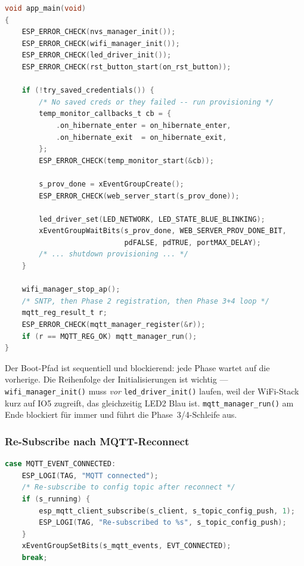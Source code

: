 \documentclass[a4paper,12pt]{article}
\begin{document}
\begin{lstlisting}[language=C, caption={Auszug aus
\texttt{gb-src/main/gb-src.c} --- Phasen-Orchestrierung.}]
void app_main(void)
{
    ESP_ERROR_CHECK(nvs_manager_init());
    ESP_ERROR_CHECK(wifi_manager_init());
    ESP_ERROR_CHECK(led_driver_init());
    ESP_ERROR_CHECK(rst_button_start(on_rst_button));

    if (!try_saved_credentials()) {
        /* No saved creds or they failed -- run provisioning */
        temp_monitor_callbacks_t cb = {
            .on_hibernate_enter = on_hibernate_enter,
            .on_hibernate_exit  = on_hibernate_exit,
        };
        ESP_ERROR_CHECK(temp_monitor_start(&cb));

        s_prov_done = xEventGroupCreate();
        ESP_ERROR_CHECK(web_server_start(s_prov_done));

        led_driver_set(LED_NETWORK, LED_STATE_BLUE_BLINKING);
        xEventGroupWaitBits(s_prov_done, WEB_SERVER_PROV_DONE_BIT,
                            pdFALSE, pdTRUE, portMAX_DELAY);
        /* ... shutdown provisioning ... */
    }

    wifi_manager_stop_ap();
    /* SNTP, then Phase 2 registration, then Phase 3+4 loop */
    mqtt_reg_result_t r;
    ESP_ERROR_CHECK(mqtt_manager_register(&r));
    if (r == MQTT_REG_OK) mqtt_manager_run();
}
\end{lstlisting}

Der Boot-Pfad ist sequentiell und blockierend: jede Phase wartet auf
die vorherige. Die Reihenfolge der Initialisierungen ist wichtig ---
\texttt{wifi\_manager\_init()} muss \emph{vor}
\texttt{led\_driver\_init()} laufen, weil der WiFi-Stack kurz auf
IO5 zugreift, das gleichzeitig LED2 Blau ist. \texttt{mqtt\_manager\_run()}
am Ende blockiert für immer und führt die Phase~3/4-Schleife aus.

\subsubsection{Re-Subscribe nach MQTT-Reconnect}

\begin{lstlisting}[language=C, caption={Auszug aus
\texttt{mqtt\_manager.c} --- automatisches Re-Subscribe bei Reconnect.}]
case MQTT_EVENT_CONNECTED:
    ESP_LOGI(TAG, "MQTT connected");
    /* Re-subscribe to config topic after reconnect */
    if (s_running) {
        esp_mqtt_client_subscribe(s_client, s_topic_config_push, 1);
        ESP_LOGI(TAG, "Re-subscribed to %s", s_topic_config_push);
    }
    xEventGroupSetBits(s_mqtt_events, EVT_CONNECTED);
    break;
\end{lstlisting}
\end{document}
